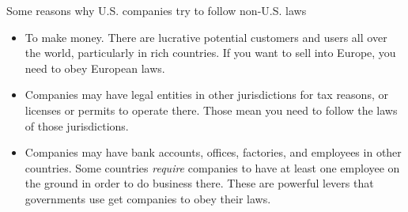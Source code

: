 \documentclass[nobackground,dvipsnames,table]{beamer}
\begin{document}
\begin{frame}{Some reasons why U.S. companies try to follow non-U.S. laws}
\begin{itemize}
    \item To make money. There are lucrative potential customers and users all over the world, particularly in rich countries. If you want to sell into Europe, you need to obey European laws.
    \item Companies may have legal entities in other jurisdictions for tax reasons, or licenses or permits to operate there. Those mean you need to follow the laws of those jurisdictions.
    \item Companies may have bank accounts, offices, factories, and employees in other countries. Some countries \emph{require} companies to have at least one employee on the ground in order to do business there. These are powerful levers that governments use get companies to obey their laws.
\end{itemize}


\end{frame}
\end{document}
